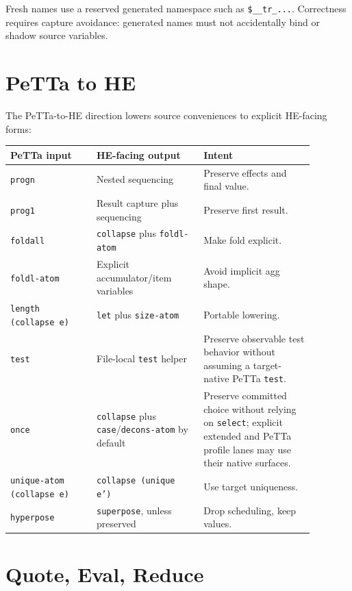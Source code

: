 \documentclass[11pt]{article}
\newcommand{\code}[1]{\texttt{#1}}
\newcommand{\HE}{\textup{HE}}
\newcommand{\PeTTa}{\textup{PeTTa}}
\begin{document}
Fresh names use a reserved generated namespace such as \code{\$\_\_tr\_...}.
Correctness requires capture avoidance: generated names must not accidentally
bind or shadow source variables.

\section{\PeTTa{} to \HE{}}

The \PeTTa{}-to-\HE{} direction lowers source conveniences to explicit
\HE{}-facing forms:

\begin{center}
\begin{tabular}{>{\raggedright\arraybackslash}p{0.25\linewidth}
                >{\raggedright\arraybackslash}p{0.31\linewidth}
                >{\raggedright\arraybackslash}p{0.32\linewidth}}
\toprule
\PeTTa{} input & \HE{}-facing output & Intent \\
\midrule
\code{progn} & Nested sequencing & Preserve effects and final value. \\
\code{prog1} & Result capture plus sequencing & Preserve first result. \\
\code{foldall} & \code{collapse} plus \code{foldl-atom} & Make fold explicit. \\
\code{foldl-atom} & Explicit accumulator/item variables & Avoid implicit agg shape. \\
\code{length (collapse e)} & \code{let} plus \code{size-atom} & Portable lowering. \\
\code{test} & File-local \code{test} helper &
Preserve observable test behavior without assuming a target-native
\PeTTa{} \code{test}. \\
\code{once} & \code{collapse} plus \code{case}/\code{decons-atom} by default &
Preserve committed choice without relying on \code{select}; explicit extended
and \PeTTa{} profile lanes may use their native surfaces. \\
\code{unique-atom (collapse e)} & \code{collapse (unique e')} & Use target uniqueness. \\
\code{hyperpose} & \code{superpose}, unless preserved & Drop scheduling, keep values. \\
\bottomrule
\end{tabular}
\end{center}

\section{Quote, Eval, Reduce}
\label{sec:quote}
\end{document}
